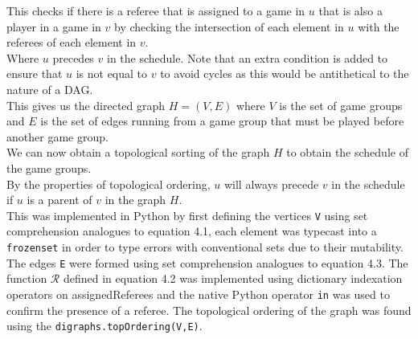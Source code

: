 \documentclass{template/custombook}
\newcommand{\python}{\texttt}
\begin{document}
        This checks if there is a referee that is assigned to a game in $u$ that is also a player in a game in $v$ by checking the intersection of each element in $u$ with the referees of each element in $v$.\\
        Where $u$ precedes $v$ in the schedule. Note that an extra 
        condition is added to ensure that $u$ is not equal to $v$ to 
        avoid cycles as this would be antithetical to the nature of a DAG\cite{lecture08}.\\    
        This gives us the directed graph $H = (V, E)$ where $V$ is the set of game groups and $E$ is the set of edges running from a game group that must be played before another game group.\\
        We can now obtain a topological sorting of the graph $H$ to obtain the schedule of the game groups.\\
        By the properties of topological ordering, $u$ will always precede $v$ in the schedule if $u$ is a parent of $v$ in the graph $H$.\\
        This was implemented in Python by first defining the vertices \python{V} using set comprehension analogues to equation 4.1, each element was typecast into a \python{frozenset} in order to type errors with conventional sets due to their mutability. The edges \python{E} were formed using set comprehension analogues to equation 4.3. The function $\mathcal{R}$ defined in equation 4.2 was implemented using dictionary indexation operators on assignedReferees and 
        the native Python operator \python{in} was used to confirm the presence of a referee. The topological ordering of the graph was found using the \python{digraphs.topOrdering(V,E)}.
\end{document}
